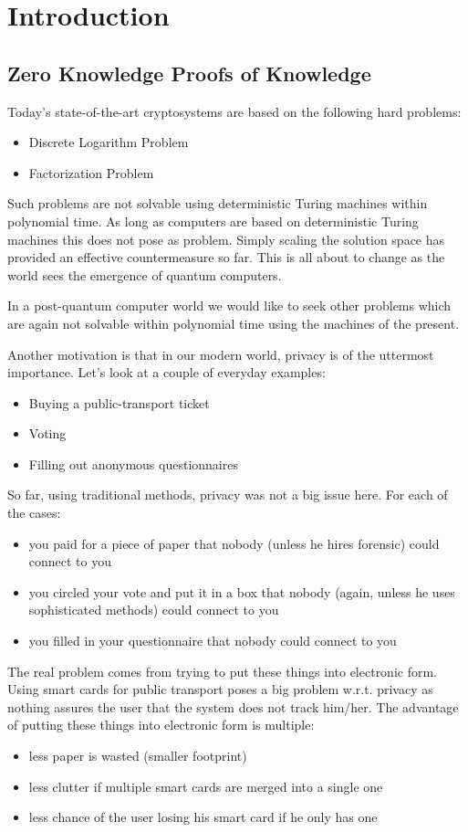 \chapter{Introduction}

\section{Zero Knowledge Proofs of Knowledge}

Today's state-of-the-art cryptosystems are based on the following hard
problems:
\begin{itemize}
\item Discrete Logarithm Problem
\item Factorization Problem
\end{itemize}

Such problems are not solvable using deterministic Turing machines
within polynomial time.  As long as computers are based on
deterministic Turing machines this does not pose as problem.  Simply
scaling the solution space has provided an effective countermeasure so
far. This is all about to change as the world sees the emergence of
quantum computers.

In a post-quantum computer world we would like to seek other problems
which are again not solvable within polynomial time using the machines
of the present.

Another motivation is that in our modern world, privacy is of the
uttermost importance. Let's look at a couple of everyday examples:
\begin{itemize}
\item Buying a public-transport ticket
\item Voting
\item Filling out anonymous questionnaires
\end{itemize}

So far, using traditional methods, privacy was not a big issue here. For
each of the cases:
\begin{itemize}
\item you paid for a piece of paper that nobody (unless he hires
  forensic) could connect to you
\item you circled your vote and put it in a box that nobody (again,
  unless he uses sophisticated methods) could connect to you
\item you filled in your questionnaire that nobody could connect to
  you
\end{itemize}

The real problem comes from trying to put these things into electronic
form. Using smart cards for public transport poses a big problem
w.r.t. privacy as nothing assures the user that the system does not
track him/her. The advantage of putting these things into electronic
form is multiple:
\begin{itemize}
\item less paper is wasted (smaller footprint)
\item less clutter if multiple smart cards are merged into a single
  one
\item less chance of the user losing his smart card if he only has one
\end{itemize}

